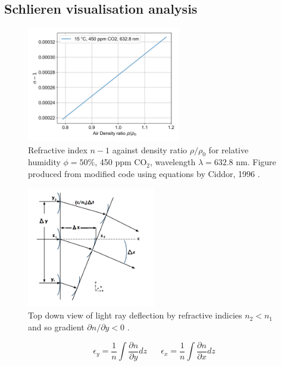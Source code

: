 \documentclass{article}
\begin{document}
\subsection{Schlieren visualisation analysis}

\begin{figure}[H]
    \centering
    \includegraphics[width=0.6\textwidth]{dry_air_15_rho_vs_n.png}
    \caption{Refractive index $n-1$ against density ratio $\rho/\rho_0$ for relative humidity $\phi = 50\%$, 450 ppm $ \text{CO}_2 $, wavelength $\lambda = 632.8$ nm. Figure produced from modified code \cite{refractiveindex_info} using equations by Ciddor, 1996 \cite{Ciddor:96}.}
    \label{fig:refractive_index_vs_density}
\end{figure}

\begin{figure}[H]
    \centering
    \includegraphics[width=0.5\textwidth]{Mazumdar_Amrita_shlierien_refraction.png}
    \caption{Top down view of light ray deflection by refractive indicies $n_2 < n_1$ and so gradient $\partial n/ \partial y < 0$ \cite{Mazumdar_Amrita:2013}.}
    \label{fig:refraction_diagram}
\end{figure}

\begin{equation}
    \epsilon_y = \frac{1}{n}\int \frac{\partial n}{\partial y} dz \;\;\;\;\;\; \epsilon_x = \frac{1}{n}\int \frac{\partial n}{\partial x} dz
    \label{eqn:refractive_index_gradient}
\end{equation}
\end{document}
